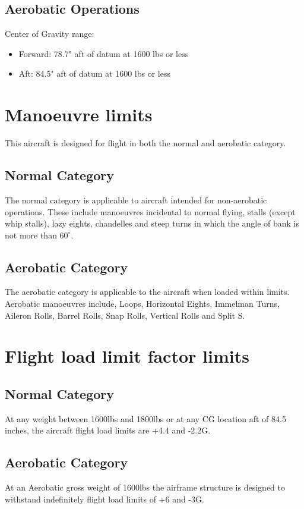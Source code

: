 \subsection{Aerobatic Operations}
Center of Gravity range:
\begin{itemize}
\item{Forward:} 78.7" aft of datum at 1600 lbs or less
\item{Aft:} 84.5" aft of datum at 1600 lbs or less
\end{itemize}

\section{Manoeuvre limits}
This aircraft is designed for flight in both the normal and aerobatic category.
\subsection{Normal Category}
The normal category is applicable to aircraft intended for non-aerobatic operations.  These include manoeuvres incidental to normal flying, stalls (except whip stalls), lazy eights, chandelles and steep turns in which the angle of bank is not more than $60^{\circ}$.

\subsection{Aerobatic Category}
The aerobatic category is applicable to the aircraft when loaded within limits.  Aerobatic manoeuvres include, Loops, Horizontal Eights, Immelman Turns, Aileron Rolls, Barrel Rolls, Snap Rolls, Vertical Rolls and Split S.

\section{Flight load limit factor limits}
\subsection{Normal Category}
At any weight between 1600lbs and 1800lbs or at any CG location aft of 84.5 inches, the aircraft flight load limits are +4.4 and -2.2G.

\subsection{Aerobatic Category}
At an Aerobatic gross weight of 1600lbs the airframe structure is designed to withstand indefinitely flight load limits of +6 and -3G.  

